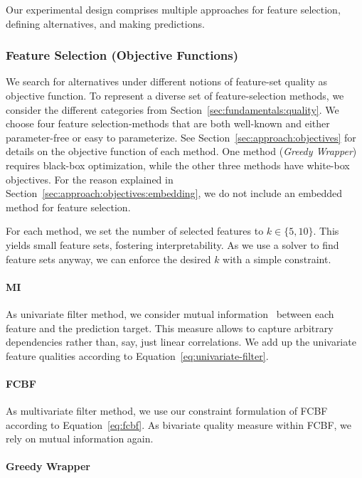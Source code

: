 \documentclass{article}
\theoremstyle{definition}
\begin{document}
Our experimental design comprises multiple approaches for feature selection, defining alternatives, and making predictions.

\subsubsection{Feature Selection (Objective Functions)}

We search for alternatives under different notions of feature-set quality as objective function.
To represent a diverse set of feature-selection methods, we consider the different categories from Section~\ref{sec:fundamentals:quality}.
We choose four feature selection-methods that are both well-known and either parameter-free or easy to parameterize.
See Section~\ref{sec:approach:objectives} for details on the objective function of each method.
One method (\emph{Greedy Wrapper}) requires black-box optimization, while the other three methods have white-box objectives.
For the reason explained in Section~\ref{sec:approach:objectives:embedding}, we do not include an embedded method for feature selection.

For each method, we set the number of selected features to $k \in \{5,10\}$.
This yields small feature sets, fostering interpretability.
As we use a solver to find feature sets anyway, we can enforce the desired $k$ with a simple constraint.

\paragraph{MI}

As univariate filter method, we consider mutual information~\cite{kraskov2004estimating} between each feature and the prediction target.
This measure allows to capture arbitrary dependencies rather than, say, just linear correlations.
We add up the univariate feature qualities according to Equation~\ref{eq:univariate-filter}.

\paragraph{FCBF}

As multivariate filter method, we use our constraint formulation of FCBF~\cite{yu2003feature} according to Equation~\ref{eq:fcbf}.
As bivariate quality measure within FCBF, we rely on mutual information again.

\paragraph{Greedy Wrapper}
\end{document}
